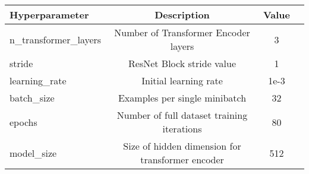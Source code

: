 {\small\begin{center}
\begin{tabular} { | l | c | c | c | }
\hline
Hyperparameter & Description & Value \\
\hline
n\_transformer\_layers & Number of Transformer Encoder layers & 3 \\
stride & ResNet Block stride value & 1 \\
learning\_rate & Initial learning rate & 1e-3 \\
batch\_size & Examples per single minibatch & 32 \\
epochs & Number of full dataset training iterations & 80 \\
model\_size & Size of hidden dimension for transformer encoder & 512 \\
\hline
\end{tabular}
\end{center}}